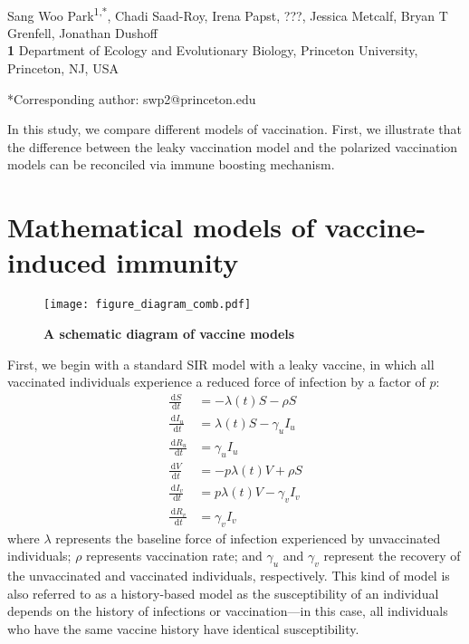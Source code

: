 \documentclass[12pt]{article}
\date{\today}
\newcommand{\dd}[1]{\ensuremath{\, \mathrm{d}#1}}
\begin{document}
\begin{flushleft}{
	\Large
	\textbf{}
}
\newline
\\
Sang Woo Park\textsuperscript{1,*}, Chadi Saad-Roy, Irena Papst, ???, Jessica Metcalf, Bryan T Grenfell, Jonathan Dushoff
\\
\bigskip
\textbf{1} Department of Ecology and Evolutionary Biology, Princeton University, Princeton, NJ, USA
\\
\bigskip

*Corresponding author: swp2@princeton.edu
\end{flushleft}

In this study, we compare different models of vaccination.
First, we illustrate that the difference between the leaky vaccination model and the polarized vaccination models can be reconciled via immune boosting mechanism.



\section{Mathematical models of vaccine-induced immunity}

\begin{figure}[!th]
\texttt{[image: figure\_diagram\_comb.pdf]}
\caption{
\textbf{A schematic diagram of vaccine models}
\label{fig:diagram}
}
\end{figure}

First, we begin with a standard SIR model with a leaky vaccine, in which all vaccinated individuals experience a reduced force of infection by a factor of $p$:
\begin{align}
\frac{\dd S}{\dd t} &= - \lambda(t) S - \rho S \\
\frac{\dd I_u}{\dd t} &= \lambda(t) S - \gamma_u I_u \\
\frac{\dd R_u}{\dd t} &= \gamma_u I_u \\
\frac{\dd V}{\dd t} &= - p \lambda(t) V + \rho S \\
\frac{\dd I_v}{\dd t} &= p \lambda(t) V - \gamma_v I_v \\
\frac{\dd R_v}{\dd t} &= \gamma_v I_v
\end{align}
where $\lambda$ represents the baseline force of infection experienced by unvaccinated individuals; $\rho$ represents vaccination rate; and $\gamma_u$ and $\gamma_v $ represent the recovery of the unvaccinated and vaccinated individuals, respectively.
This kind of model is also referred to as a history-based model as the susceptibility of an individual depends on the history of infections or vaccination---in this case, all individuals who have the same vaccine history have identical susceptibility.
\end{document}
